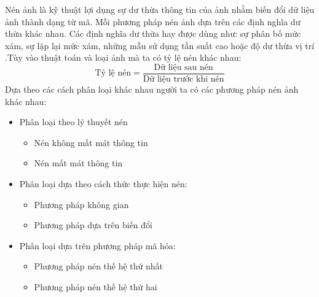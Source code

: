 \documentclass[14pt,oneside,a4paper]{extreport}
\begin{document}
Nén ảnh là kỹ thuật lợi dụng sự dư thừa thông tin của ảnh nhằm biến đổi dữ liệu ảnh thành dạng từ mã. Mỗi phương pháp nén ảnh dựa trên các định nghĩa dư thừa khác nhau. Các định nghĩa dư thừa hay được dùng như: sự phân bố mức xám, sự lặp lại mức xám, những mẫu sử dụng tần suất cao hoặc độ dư thừa vị trí .Tùy vào thuật toán và loại ảnh mà ta có tỷ lệ nén khác nhau: 
\begin{equation*}
\textrm{Tỷ lệ nén} =\dfrac{\textrm{Dữ liệu sau nén}}{\textrm{Dữ liệu trước khi nén}}
\end{equation*}
Dựa theo các cách phân loại khác nhau người ta có các phương pháp nén ảnh khác nhau:
\begin{itemize}
\item Phân loại theo lý thuyết nén
\begin{itemize}
\item Nén không mất mát thông tin
\item Nén mất mát thông tin
\end{itemize}
\item Phân loại dựa theo cách thức thực hiện nén: 
\begin{itemize}
\item Phương pháp không gian
\item Phương pháp dựa trên  biến đổi
\end{itemize}
\item Phân loại dựa trên phương pháp mã hóa:
\begin{itemize}
\item Phương pháp nén thế hệ thứ nhất
\item Phương pháp nén thế hệ thứ hai
\end{itemize}
\end{itemize}
%
\end{document}
